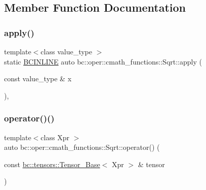 \subsection{Member Function Documentation}
\mbox{\label{structbc_1_1oper_1_1cmath__functions_1_1Sqrt_a52f2def1fd0b2e0318cd78ebdc753fcf}} 
\subsubsection{\texorpdfstring{apply()}{apply()}}
{\footnotesize\ttfamily template$<$class value\+\_\+type $>$ \\
static \hyperlink{common_8h_a6699e8b0449da5c0fafb878e59c1d4b1}{B\+C\+I\+N\+L\+I\+NE} auto bc\+::oper\+::cmath\+\_\+functions\+::\+Sqrt\+::apply (\begin{DoxyParamCaption}\item[{const value\+\_\+type \&}]{x }\end{DoxyParamCaption})\hspace{0.3cm}{\ttfamily [inline]}, {\ttfamily [static]}}

\mbox{\label{structbc_1_1oper_1_1cmath__functions_1_1Sqrt_ae3db377af08dcb7088e5df330a20a019}} 
\subsubsection{\texorpdfstring{operator()()}{operator()()}\hspace{0.1cm}{\footnotesize\ttfamily [1/3]}}
{\footnotesize\ttfamily template$<$class Xpr $>$ \\
auto bc\+::oper\+::cmath\+\_\+functions\+::\+Sqrt\+::operator() (\begin{DoxyParamCaption}\item[{const \hyperlink{classbc_1_1tensors_1_1Tensor__Base}{bc\+::tensors\+::\+Tensor\+\_\+\+Base}$<$ Xpr $>$ \&}]{tensor }\end{DoxyParamCaption})\hspace{0.3cm}{\ttfamily [inline]}}

